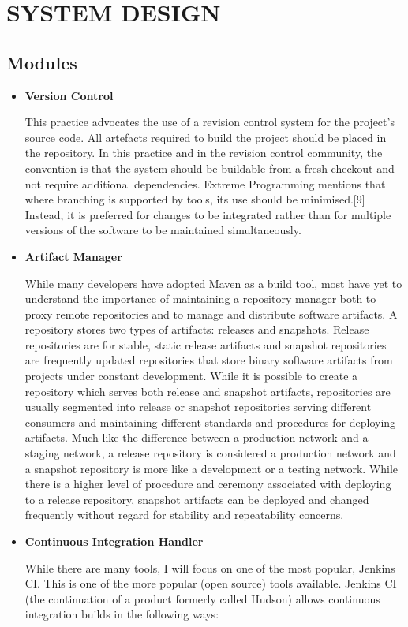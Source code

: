 \documentclass[12pt,a4paper,oneside]{report}
\begin{document}
\chapter{SYSTEM DESIGN}
\section{Modules}  
\begin{itemize}
\item \textbf{Version Control}

\par This practice advocates the use of a revision control system for the project's source code. All artefacts required to build the project should be placed in the repository. In this practice and in the revision control community, the convention is that the system should be buildable from a fresh checkout and not require additional dependencies.  Extreme Programming  mentions that where branching is supported by tools, its use should be minimised.[9] Instead, it is preferred for changes to be integrated rather than for multiple versions of the software to be maintained simultaneously. 
\item \textbf{Artifact Manager}
\par 
While many developers have adopted Maven as a build tool, most have yet to understand the importance of maintaining a repository manager both to proxy remote repositories and to manage and distribute software artifacts. A repository stores two types of artifacts: releases and snapshots. Release repositories are for stable, static release artifacts and snapshot repositories are frequently updated repositories that store binary software artifacts from projects under constant development. While it is possible to create a repository which serves both release and snapshot artifacts, repositories are usually segmented into release or snapshot repositories serving different consumers and maintaining different standards and procedures for deploying artifacts. Much like the difference between a production network and a staging network, a release repository is considered a production network and a snapshot repository is more like a development or a testing network. While there is a higher level of procedure and ceremony associated with deploying to a release repository, snapshot artifacts can be deployed and changed frequently without regard for stability and repeatability concerns.
\item\textbf{ Continuous Integration Handler}
\par While there are many tools, I will focus on one of the most popular, Jenkins CI. This is one of the more popular (open source) tools available. Jenkins CI (the continuation of a product formerly called Hudson) allows continuous integration builds in the following ways:

\end{itemize}
\end{document}
